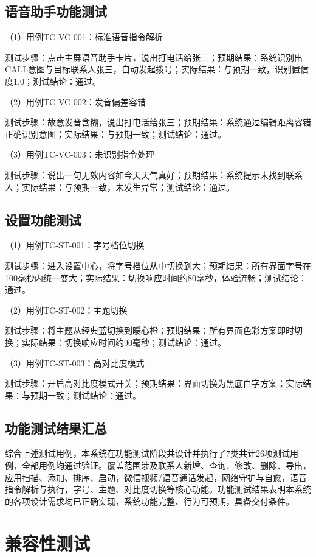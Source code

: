\subsection{语音助手功能测试}
（1）用例TC-VC-001：标准语音指令解析

测试步骤：点击主屏语音助手卡片，说出打电话给张三；预期结果：系统识别出CALL意图与目标联系人张三，自动发起拨号；实际结果：与预期一致，识别置信度1.0；测试结论：通过。

（2）用例TC-VC-002：发音偏差容错

测试步骤：故意发音含糊，说出打电活给张三；预期结果：系统通过编辑距离容错正确识别意图；实际结果：与预期一致；测试结论：通过。

（3）用例TC-VC-003：未识别指令处理

测试步骤：说出一句无效内容如今天天气真好；预期结果：系统提示未找到联系人；实际结果：与预期一致，未发生异常；测试结论：通过。

\subsection{设置功能测试}
（1）用例TC-ST-001：字号档位切换

测试步骤：进入设置中心，将字号档位从中切换到大；预期结果：所有界面字号在100毫秒内统一变大；实际结果：切换响应时间约80毫秒，体验流畅；测试结论：通过。

（2）用例TC-ST-002：主题切换

测试步骤：将主题从经典蓝切换到暖心橙；预期结果：所有界面色彩方案即时切换；实际结果：切换响应时间约90毫秒；测试结论：通过。

（3）用例TC-ST-003：高对比度模式

测试步骤：开启高对比度模式开关；预期结果：界面切换为黑底白字方案；实际结果：与预期一致；测试结论：通过。

\subsection{功能测试结果汇总}
综合上述测试用例，本系统在功能测试阶段共设计并执行了7类共计26项测试用例，全部用例均通过验证。覆盖范围涉及联系人新增、查询、修改、删除、导出，应用扫描、添加、排序、启动，微信视频/语音通话发起，网络守护与自愈，语音指令解析与执行，字号、主题、对比度切换等核心功能。功能测试结果表明本系统的各项设计需求均已正确实现，系统功能完整、行为可预期，具备交付条件。

\section{兼容性测试}
